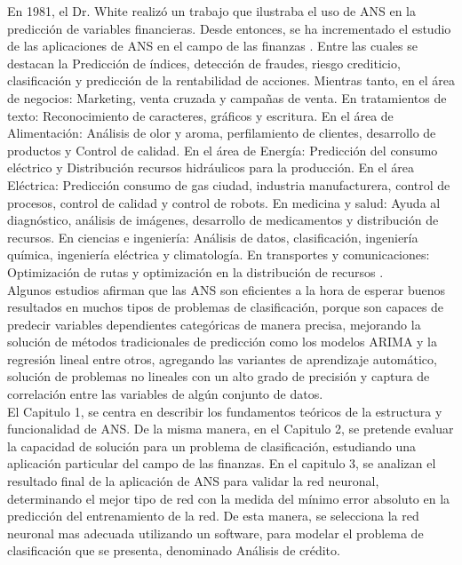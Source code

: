 \documentclass[11pt,titlepage]{report}
\begin{document}
En 1981, el Dr. White realizó un trabajo que ilustraba el uso de ANS en la predicción de variables financieras. Desde entonces, se ha incrementado el estudio de las aplicaciones de ANS en el campo de las finanzas \cite{Rev19}. Entre las cuales se destacan la Predicción de índices, detección de fraudes, riesgo crediticio, clasificación y predicción de la rentabilidad de acciones. Mientras tanto, en el área de negocios: Marketing, venta cruzada y campañas de venta. En tratamientos de texto: Reconocimiento de caracteres, gráficos y escritura. En el área de Alimentación: Análisis de olor y aroma, perfilamiento de clientes, desarrollo de productos y Control de calidad. En el área de Energía: Predicción del consumo eléctrico y Distribución recursos hidráulicos para la producción. En el área Eléctrica: Predicción consumo de gas ciudad, industria manufacturera, control de procesos, control de calidad y control de robots. En medicina y salud: Ayuda al diagnóstico, análisis de imágenes, desarrollo de medicamentos y distribución de recursos. En ciencias e ingeniería: Análisis de datos, clasificación, ingeniería química, ingeniería eléctrica y climatología. En transportes y comunicaciones: Optimización de rutas y optimización en la distribución de recursos \cite{Art13}.\\

Algunos estudios afirman que las ANS son eficientes a la hora de esperar buenos resultados en muchos tipos de problemas de clasificación, porque son capaces de predecir variables dependientes categóricas de manera precisa, mejorando la solución de métodos tradicionales de predicción como los modelos ARIMA y la regresión lineal entre otros, agregando las variantes de aprendizaje automático, solución de problemas no lineales con un alto grado de precisión y captura de correlación entre las variables de algún conjunto de datos.\\

El Capitulo 1, se centra en describir los fundamentos teóricos de la estructura y funcionalidad de ANS. De la misma manera, en el Capitulo 2, se pretende evaluar la capacidad de solución para un problema de clasificación, estudiando una aplicación particular del campo de las finanzas. En el capitulo 3, se analizan el resultado final de la aplicación de ANS para validar la red neuronal, determinando el mejor tipo de red con la medida del mínimo error absoluto en la predicción del entrenamiento de la red. De esta manera, se selecciona la red neuronal mas adecuada utilizando un software, para modelar el problema de clasificación que se presenta, denominado Análisis de crédito.
\end{document}
